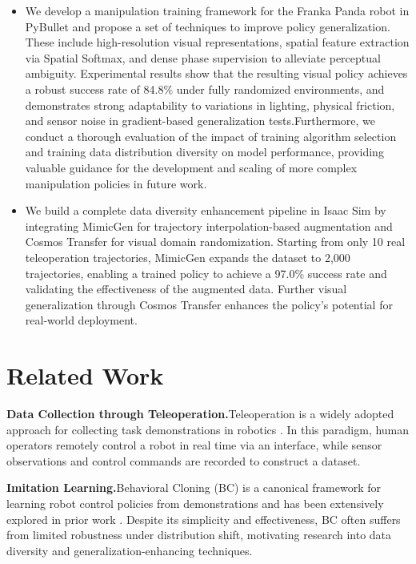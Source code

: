 \documentclass{article} %
\begin{document}
\begin{minipage}{\linewidth}
\begin{itemize}
\item  We develop a manipulation training framework for the Franka Panda robot in PyBullet and propose a set of techniques to improve policy generalization. These include high-resolution visual representations, spatial feature extraction via Spatial Softmax, and dense phase supervision to alleviate perceptual ambiguity. Experimental results show that the resulting visual policy achieves a robust success rate of 84.8\% under fully randomized environments, and demonstrates strong adaptability to variations in lighting, physical friction, and sensor noise in gradient-based generalization tests.Furthermore, we conduct a thorough evaluation of the impact of training algorithm selection and training data distribution diversity on model performance, providing valuable guidance for the development and scaling of more complex manipulation policies in future work.

\item  We build a complete data diversity enhancement pipeline in Isaac Sim by integrating MimicGen\cite{jiang2025dexmimicgenautomateddatageneration} for trajectory interpolation-based augmentation and Cosmos Transfer\cite{nvidia2025cosmosworldfoundationmodel} for visual domain randomization. Starting from only 10 real teleoperation trajectories, MimicGen expands the dataset to 2,000 trajectories, enabling a trained policy to achieve a 97.0\% success rate and validating the effectiveness of the augmented data. Further visual generalization through Cosmos Transfer enhances the policy’s potential for real-world deployment.
\end{itemize}
\end{minipage}
\section{Related Work}

{\bfseries Data Collection through Teleoperation.}Teleoperation is a widely adopted approach for collecting task demonstrations in robotics\cite{zhang2018deepimitationlearningcomplex} . In this paradigm, human operators remotely control a robot in real time via an interface, while sensor observations and control commands are recorded to construct a dataset.

{\bfseries Imitation Learning.}Behavioral Cloning (BC) is a canonical framework for learning robot control policies from demonstrations and has been extensively explored in prior work\cite{Pomerleau2015ALVINNAA} .  Despite its simplicity and effectiveness, BC often suffers from limited robustness under distribution shift, motivating research into data diversity and generalization-enhancing techniques.
\end{document}
